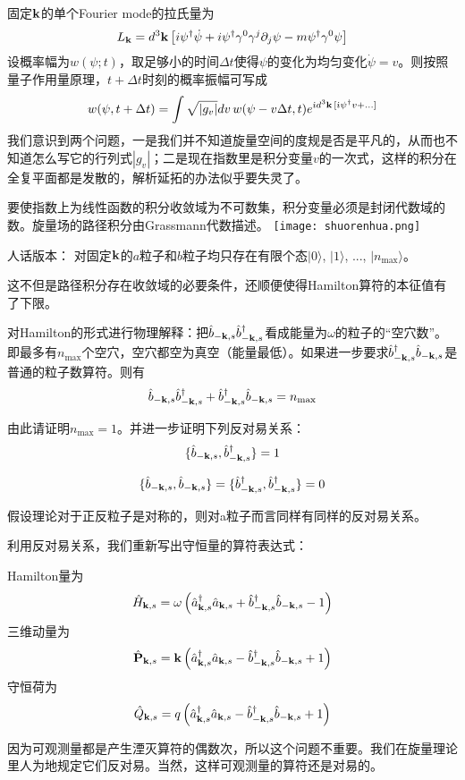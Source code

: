 \documentclass[CJK]{beamer}
\begin{document}
\begin{frame}
\bch
固定${\mathbf{k}}$的单个Fourier mode的拉氏量为
$$L_{\mathbf{k}} = d^3{\mathbf{k}} \left[ i\psi^\dagger\dot\psi + i\psi^\dagger\gamma^0\gamma^j\partial_j\psi - m \psi^\dagger\gamma^0 \psi \right]$$
设概率幅为$w(\psi;t)$，取足够小的时间$\Delta t$使得$\psi$的变化为均匀变化$\dot\psi = v$。则按照量子作用量原理，$t+\Delta t$时刻的概率振幅可写成
$$w(\psi, t+\Delta t) = \int \sqrt{|g_v|}dv\, w(\psi - v \Delta t, t) e^{{\dot{\imath}} d^3{\mathbf{k}}\,[{\dot{\imath}}\psi^\dagger v + \ldots]}$$
我们意识到两个问题，一是我们并不知道旋量空间的度规是否是平凡的，从而也不知道怎么写它的行列式$|g_v|$；二是现在指数里是积分变量$v$的一次式，这样的积分在全复平面都是发散的，解析延拓的办法似乎要失灵了。
\ech
\end{frame}


\begin{frame}
\bch
要使指数上为线性函数的积分收敛域为不可数集，积分变量必须是封闭代数域的数。旋量场的路径积分由Grassmann代数描述。
\texttt{[image: shuorenhua.png]}

\ech
\end{frame}



\begin{frame}
\bch
人话版本： 对固定${\mathbf{k}}$的$a$粒子和$b$粒子均只存在有限个态$|0\rangle$, $|1\rangle$, ..., $|n_{\max}\rangle$。

\skipline
\skipline
\skipline
这不但是路径积分存在收敛域的必要条件，还顺便使得Hamilton算符的本征值有了下限。
\ech
\end{frame}


\begin{frame}
\bch
对Hamilton的形式进行物理解释：把${\hat{b}}_{-{\mathbf{k}},s}{\hat{b}^\dagger}_{-{\mathbf{k}},s}$看成能量为$\omega$的粒子的“空穴数”。即最多有$n_{\max}$个空穴，空穴都空为真空（能量最低）。如果进一步要求${\hat{b}^\dagger}_{-{\mathbf{k}},s}{\hat{b}}_{-{\mathbf{k}},s}$是普通的粒子数算符。则有
$${\hat{b}}_{-{\mathbf{k}},s}{\hat{b}^\dagger}_{-{\mathbf{k}},s} + {\hat{b}^\dagger}_{-{\mathbf{k}},s}{\hat{b}}_{-{\mathbf{k}},s} = n_{\max}$$ 

由此请证明$n_{\max} = 1$。并进一步证明下列反对易关系：
$$\{{\hat{b}}_{-{\mathbf{k}},s},{\hat{b}^\dagger}_{-{\mathbf{k}},s}\} = 1$$

$$\{{\hat{b}}_{-{\mathbf{k}},s}, {\hat{b}}_{-{\mathbf{k}},s} \} = \{ {\hat{b}^\dagger}_{-{\mathbf{k}},s}, {\hat{b}^\dagger}_{-{\mathbf{k}},s}\} = 0$$

假设理论对于正反粒子是对称的，则对a粒子而言同样有同样的反对易关系。
\ech
\end{frame}


\begin{frame}
\bch
利用反对易关系，我们重新写出守恒量的算符表达式：

Hamilton量为
$$\hat{H}_{{\mathbf{k}},s} =  \omega\left({\hat{a}^\dagger}_{{\mathbf{k}},s}{\hat{a}}_{{\mathbf{k}},s} + {\hat{b}^\dagger}_{-{\mathbf{k}},s}{\hat{b}}_{-{\mathbf{k}},s} -1\right)$$
三维动量为
$$\hat{\mathbf{P}}_{{\mathbf{k}},s} =  {\mathbf{k}}\left({\hat{a}^\dagger}_{{\mathbf{k}},s}{\hat{a}}_{{\mathbf{k}},s} - {\hat{b}^\dagger}_{-{\mathbf{k}},s}{\hat{b}}_{-{\mathbf{k}},s} + 1 \right)$$
守恒荷为
$$\hat{Q}_{{\mathbf{k}},s} =  q\left({\hat{a}^\dagger}_{{\mathbf{k}},s}{\hat{a}}_{{\mathbf{k}},s} - {\hat{b}^\dagger}_{-{\mathbf{k}},s}{\hat{b}}_{-{\mathbf{k}},s} + 1 \right)$$

\ech
\end{frame}

\begin{frame}
\bch

因为可观测量都是产生湮灭算符的偶数次，所以这个问题不重要。我们在旋量理论里人为地规定它们反对易。当然，这样可观测量的算符还是对易的。
\ech
\end{frame}
\end{document}
